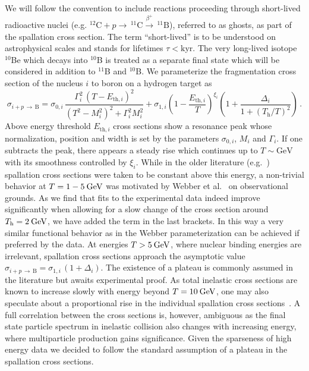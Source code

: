 \documentclass[a4paper,11pt]{article}
\newcommand{\eVdist}{\kern-0.06em}
\newcommand{\gev}{\:\text{Ge\eVdist V}}
\begin{document}
We will follow the convention to include reactions proceeding through short-lived radioactive nuclei (e.g. $^{12}\text{C}+p\rightarrow \,^{11}\text{C}\xrightarrow{\beta^+} \,^{11}\text{B}$), referred to as ghosts, as part of the spallation cross section. The term ``short-lived'' is to be understood on astrophysical scales and stands for lifetimes $\tau < \text{kyr}$. The very long-lived isotope $^{10}$Be which decays into $^{10}$B is treated as a separate final state which will be considered in addition to $^{11}$B and $^{10}$B. We parameterize the fragmentation cross section of the nucleus $i$ to boron on a hydrogen target as
 \begin{equation}\label{eq:fragmentation}
 \sigma_{i+p\,\rightarrow\, \text{B}} = \sigma_{0,i} \,\frac{\Gamma_i^2\,(T-E_{\text{th},i})^2}{(T^2-M_i^2)^2 +\Gamma_i^2 M_i^2} + \sigma_{1,i} \left(1- \frac{E_{\text{th},i}}{T}\right)^{\xi_i} \left(1+ \frac{\Delta_i}{1+(T_\text{h}/T)^2} \right)\,.
\end{equation}
Above energy threshold $E_{\text{th},i}$ cross sections show a resonance peak whose normalization, position and width is set by the parameters $\sigma_{0,i}$, $M_i$ and $\Gamma_i$. If one subtracts the peak, there appears a steady rise which continues up to $T\sim\text{GeV}$ with its smoothness controlled by $\xi_i$. While in the older literature (e.g.~\cite{Read:1984xme}) spallation cross sections were taken to be constant above this energy, a non-trivial behavior at $T=1-5\gev$ was motivated by Webber et al.~\cite{Webber:2003} on observational grounds. As we find that fits to the experimental data indeed improve significantly when allowing for a slow change of the cross section around $T_\text{h}=2\gev$, we have added the term in the last brackets. In this way a very similar functional behavior as in the Webber parameterization can be achieved if preferred by the data. At energies $T > 5\gev$, where nuclear binding energies are irrelevant, spallation cross sections approach the asymptotic value $\sigma_{i+p\,\rightarrow\, \text{B}} = \sigma_{1,i}\, (1 + \Delta_i)$. The existence of a plateau is commonly assumed in the literature but awaits experimental proof. As total inelastic cross sections are known to increase slowly with energy beyond $T=10\gev$, one may also speculate about a proportional rise in the individual spallation cross sections~\cite{Genolini:2017dfb}. A full correlation between the cross sections is, however, ambiguous as the final state particle spectrum in inelastic collision also changes with increasing energy, where multiparticle production gains significance. Given the sparseness of high energy data we decided to follow the standard assumption of a plateau in the spallation cross sections.
\end{document}
